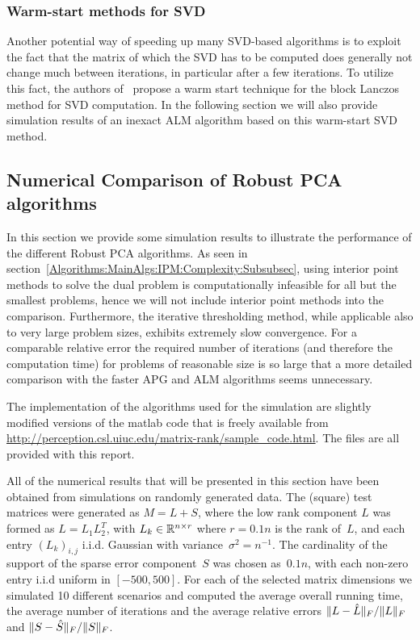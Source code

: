 \subsubsection{Warm-start methods for SVD}
\label{Algorithms:Discussion:SVD:WarmstartSVD:Subsubsec}

Another potential way of speeding up many SVD-based algorithms is to exploit the fact that the matrix of which the SVD has to be computed does generally not change much between iterations, in particular after a few iterations. To utilize this fact, the authors of~\cite{Lin:2010uq} propose a warm start technique for the block Lanczos method for SVD computation. In the following section we will also provide simulation results of an inexact ALM algorithm based on this warm-start SVD method. 



\subsection{Numerical Comparison of Robust PCA algorithms}
\label{Algorithms:Discussion:NumComp:Subsec}

In this section we provide some simulation results to illustrate the performance of the different Robust PCA algorithms. As seen in section~\ref{Algorithms:MainAlgs:IPM:Complexity:Subsubsec}, using interior point methods to solve the dual problem is computationally infeasible for all but the smallest problems, hence we will not include interior point methods into the comparison. Furthermore, the iterative thresholding method, while applicable also to very large problem sizes, exhibits extremely slow convergence. For a comparable relative error the required number of iterations (and therefore the computation time) for problems of reasonable size is so large that a more detailed comparison with the faster APG and ALM algorithms seems unnecessary. 

The implementation of the algorithms used for the simulation are slightly modified versions of the matlab code that is freely available from \url{http://perception.csl.uiuc.edu/matrix-rank/sample_code.html}. The files are all provided with this report. 

All of the numerical results that will be presented in this section have been obtained from simulations on randomly generated data. The (square) test matrices were generated as  $M=L+S$, where the low rank component $L$ was formed as $L=L_1L_2^T$, with $L_k \in {\mathbb R}^{n\times r}$ where $r=0.1n$ is the rank of~$L$, and each entry $(L_k)_{i,j}$ i.i.d. Gaussian with variance~$\sigma^2 =n^{-1}$. The cardinality of the support of the sparse error component~$S$ was chosen as~$0.1n$, with each non-zero entry i.i.d uniform in $[-500,500]$. For each of the selected matrix dimensions we simulated 10 different scenarios and computed the average overall running time, the average number of iterations and the average relative errors $\|L-{\hat{L}}\|_F / \|L\|_F$ and $\|S-{\hat{S}}\|_F / \|S\|_F$. 



